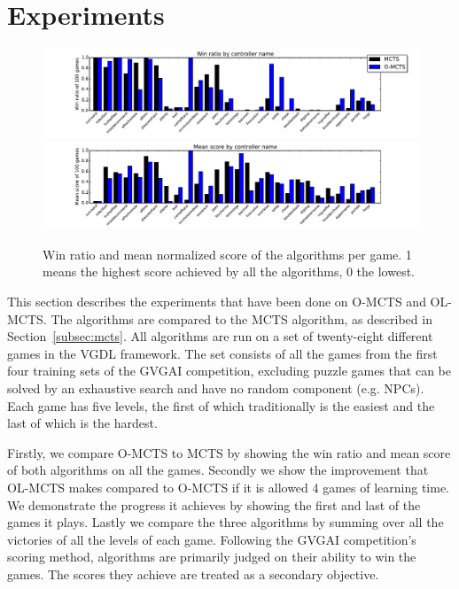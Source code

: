 \section{Experiments}
\label{sec:experiments}
\begin{figure}
\centering
\includegraphics[width=\textwidth]{includes/wins}
\centering
\includegraphics[width=\textwidth]{includes/scores}
\vspace{-.8cm}
\caption{Win ratio and mean normalized score of the algorithms per game. 1 means
the highest score achieved by all the algorithms, 0 the lowest.}
\label{fig:scores}
\end{figure}

This section describes the experiments that have been done on
O-MCTS and OL-MCTS\@. The algorithms are compared to the MCTS
algorithm, as described in Section~\ref{subsec:mcts}. All algorithms are run on a set of
twenty-eight different games in the VGDL framework. The set consists of all the
games from the first four training sets of the GVGAI competition, excluding
puzzle games that can be solved by an exhaustive search and have no random
component (e.g. NPCs). Each game has five levels, the first of which
traditionally is the easiest and the last of which is the hardest.

Firstly, we compare O-MCTS to MCTS by showing the win ratio and mean score of
both algorithms on all the games. Secondly we show the improvement that OL-MCTS
makes compared to O-MCTS if it is allowed 4 games of learning time. We
demonstrate the progress it achieves by showing the first and last of the games
it plays.  Lastly we compare the three algorithms by summing over all the
victories of all the levels of each game.  Following the GVGAI competition's
scoring method, algorithms are primarily judged on their ability to win the
games. The scores they achieve are treated as a secondary objective.

